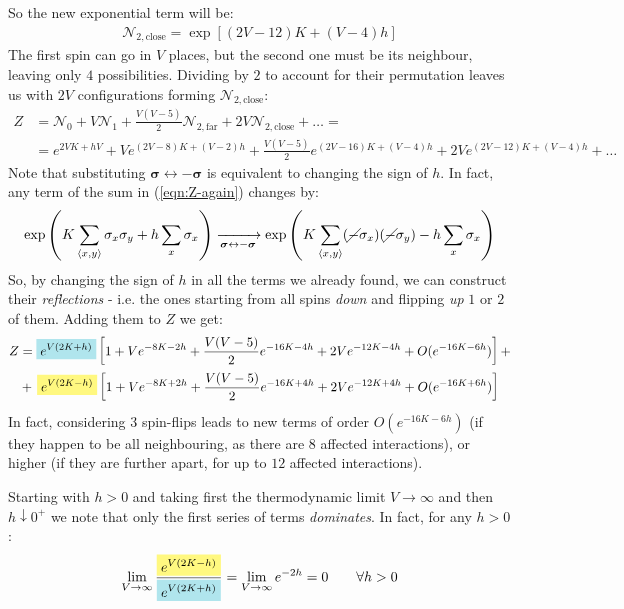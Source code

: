 \documentclass[../template.tex]{subfiles}
\begin{document}
So the new exponential term will be:
\begin{align*}
    \mathcal{N}_{2,\mathrm{close}} = \exp[(2V - 12)K + (V-4)h]
\end{align*}
The first spin can go in $V$ places, but the second one must be its neighbour, leaving only $4$ possibilities. Dividing by $2$ to account for their permutation leaves us with $2V$ configurations forming $\mathcal{N}_{2,\mathrm{close}}$:
\begin{align*}
    Z &= \mathcal{N}_0 + V \mathcal{N}_1 + \frac{V(V-5)}{2} \mathcal{N}_{2,\mathrm{far}} + 2V \mathcal{N}_{2,\mathrm{close}} + \dots =\\
    &= e^{2VK + hV} + V e^{(2V-8)K + (V-2)h} + \frac{V(V-5)}{2} e^{(2V-16)K + (V-4)h}  + 2V e^{(2V-12)K + (V-4)h} + \dots
\end{align*}
Note that substituting $\bm{\sigma} \leftrightarrow -\bm{\sigma}$ is equivalent to changing the sign of $h$. In fact, any term of the sum in (\ref{eqn:Z-again}) changes by:
\begin{align*}
    \exp\left(K \sum_{\langle x,y \rangle} \sigma_x \sigma_y + h \sum_x \sigma_x\right) \xrightarrow[\bm{\sigma} \leftrightarrow -\bm{\sigma}]{} \exp\left(K \sum_{\langle x,y \rangle}(\cancel{-}\sigma_x)(\cancel{-}\sigma_y) - h\sum_x \sigma_x\right)
\end{align*}
So, by changing the sign of $h$ in all the terms we already found, we can construct their \textit{reflections} - i.e. the ones starting from all spins \textit{down} and flipping \textit{up} $1$ or $2$ of them. Adding them to $Z$ we get:
\begin{align*}
    Z &= \hlc{SkyBlue}{e^{V(2K+h)}}\left[1+ V e^{-8K - 2h} + \frac{V(V-5)}{2} e^{-16K - 4h} + 2 V e^{-12K - 4h}  + O(e^{-16K - 6h}) \right] +\\
    &+\,\hlc{Yellow}{e^{V(2K-h)}}\left[1 + V e^{-8K + 2h} + \frac{V(V-5)}{2} e^{-16K + 4h} + 2 V e^{-12K + 4h} + O(e^{-16K + 6h})\right] 
\end{align*}
In fact, considering $3$ spin-flips leads to new terms of order $O(e^{-16K - 6h})$ (if they happen to be all neighbouring, as there are $8$ affected interactions), or higher (if they are further apart, for up to $12$ affected interactions).

\medskip

Starting with $h > 0$ and taking first the thermodynamic limit $V \to \infty$ and then $h \downarrow 0^+$ we note that only the first series of terms \textit{dominates}. In fact, for any $h > 0$:
\begin{align*}
    \lim_{V \to \infty} \frac{\hlc{Yellow}{e^{V(2K-h)}}}{\hlc{SkyBlue}{e^{V(2K+h)}}} = \lim_{V \to \infty} e^{-2h} = 0 \qquad \forall h > 0
\end{align*}
\end{document}
